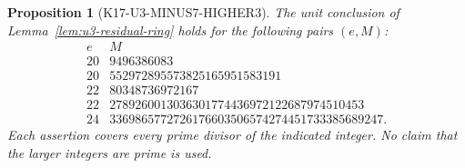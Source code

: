 \documentclass[11pt,a4paper]{article}
\newtheorem{proposition}[theorem]{Proposition}
\theoremstyle{definition}
\begin{document}
\begin{proposition}[K17-U3-MINUS7-HIGHER3]\label{prop:u3-minus7-higher3}
The unit conclusion of Lemma~\ref{lem:u3-residual-ring} holds for
the following pairs $(e,M)$:
\[
 \begin{array}{c|l}
 e&M\\ \hline
 20&9496386083\\
 20&552972895573825165951583191\\
 22&80348736972167\\
 22&2789260013036301774436972122687974510453\\
 24&3369865772726176603506574274451733385689247.
 \end{array}
 \tag{UR.8}
\]
Each assertion covers every prime divisor of the indicated
integer. No claim that the larger integers are prime is used.
\end{proposition}
\end{document}
